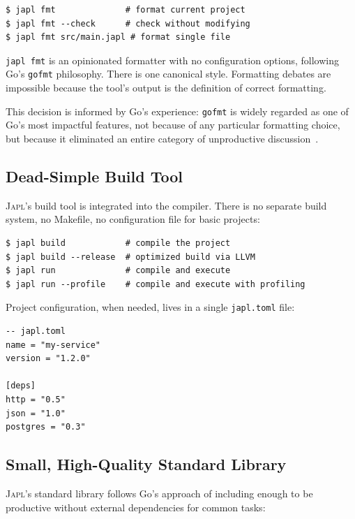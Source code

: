 \documentclass[11pt,twocolumn]{article}
\newcommand{\japl}{\textsc{Japl}}
\begin{document}
\begin{lstlisting}[language=shell]
$ japl fmt              # format current project
$ japl fmt --check      # check without modifying
$ japl fmt src/main.japl # format single file
\end{lstlisting}

\texttt{japl fmt} is an opinionated formatter with no configuration options, following Go's \texttt{gofmt} philosophy.
There is one canonical style.
Formatting debates are impossible because the tool's output is the definition of correct formatting.

This decision is informed by Go's experience: \texttt{gofmt} is widely regarded as one of Go's most impactful features, not because of any particular formatting choice, but because it eliminated an entire category of unproductive discussion~\citep{pike2012go}.

\subsection{Dead-Simple Build Tool}

\japl{}'s build tool is integrated into the compiler.
There is no separate build system, no Makefile, no configuration file for basic projects:

\begin{lstlisting}[language=shell]
$ japl build            # compile the project
$ japl build --release  # optimized build via LLVM
$ japl run              # compile and execute
$ japl run --profile    # compile and execute with profiling
\end{lstlisting}

Project configuration, when needed, lives in a single \texttt{japl.toml} file:

\begin{lstlisting}[language=japl,basicstyle=\ttfamily\scriptsize]
-- japl.toml
name = "my-service"
version = "1.2.0"

[deps]
http = "0.5"
json = "1.0"
postgres = "0.3"
\end{lstlisting}

\subsection{Small, High-Quality Standard Library}

\japl{}'s standard library follows Go's approach of including enough to be productive without external dependencies for common tasks:
\end{document}
